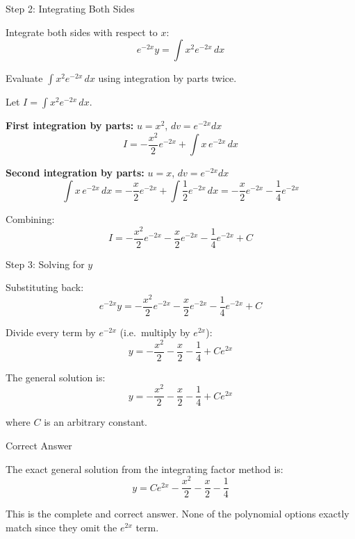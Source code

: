 \documentclass{beamer}
\numberwithin{equation}{section}
\theoremstyle{remark}
\begin{document}
\begin{frame}{Step 2: Integrating Both Sides}

Integrate both sides with respect to $x$:
\[
  e^{-2x}y = \int x^2 e^{-2x}\,dx
\]

Evaluate $\int x^2 e^{-2x}\,dx$ using integration by parts twice.

Let $I = \int x^2 e^{-2x}\,dx$.

\textbf{First integration by parts:} $u = x^2$, $dv = e^{-2x}dx$
\[
  I = -\frac{x^2}{2}e^{-2x} + \int x\,e^{-2x}\,dx
\]

\textbf{Second integration by parts:} $u = x$, $dv = e^{-2x}dx$
\[
  \int x\,e^{-2x}\,dx = -\frac{x}{2}e^{-2x} + \int \frac{1}{2}e^{-2x}\,dx
  = -\frac{x}{2}e^{-2x} - \frac{1}{4}e^{-2x}
\]

Combining:
\[
  I = -\frac{x^2}{2}e^{-2x} - \frac{x}{2}e^{-2x} - \frac{1}{4}e^{-2x} + C
\]

\end{frame}

\begin{frame}{Step 3: Solving for $y$}

Substituting back:
\[
  e^{-2x}y
  = -\frac{x^2}{2}e^{-2x} - \frac{x}{2}e^{-2x} - \frac{1}{4}e^{-2x} + C
\]

Divide every term by $e^{-2x}$ (i.e.\ multiply by $e^{2x}$):
\[
  y = -\frac{x^2}{2} - \frac{x}{2} - \frac{1}{4} + C e^{2x}
\]

The general solution is:
\[
  \boxed{y = -\frac{x^2}{2} - \frac{x}{2} - \frac{1}{4} + C e^{2x}}
\]

where $C$ is an arbitrary constant.

\end{frame}


\begin{frame}{Correct Answer}

The exact general solution from the integrating factor method is:
\[
  \boxed{y = Ce^{2x} - \frac{x^2}{2} - \frac{x}{2} - \frac{1}{4}}
\]

This is the complete and correct answer. None of the polynomial options
exactly match since they omit the $e^{2x}$ term.

\end{frame}
\end{document}
